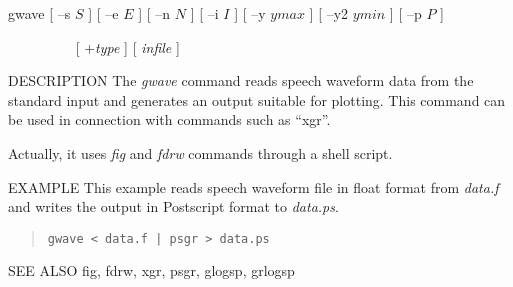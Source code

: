 
\begin{synopsis}
\item[gwave] [ --s $S$ ] [ --e $E$ ] [ --n $N$ ] [ --i $I$ ] [ --y $ymax$ ]
	       [ --y2 $ymin$ ] [ --p $P$ ] 
\item[\ ~~~~~~~~] [ +{\em type} ]  [ {\em infile} ]

\end{synopsis}

\begin{qsection}{DESCRIPTION}
The {\em gwave} command reads speech waveform data from
the standard input and generates an output suitable for
plotting.
This command can be used in connection with commands such as ``xgr''.
\par
Actually, it uses {\em fig} and {\em fdrw} commands through a
shell script.
\end{qsection}

\begin{options}
\end{options}

\begin{qsection}{EXAMPLE}
This example reads speech waveform file in float format from
{\em data.f} and writes the output in Postscript format to
{\em data.ps}.
\begin{quote}
 \verb!gwave < data.f | psgr > data.ps!
 \end{quote}
\end{qsection}

\begin{qsection}{SEE ALSO}
 fig, fdrw, xgr, psgr, glogsp, grlogsp
\end{qsection}
